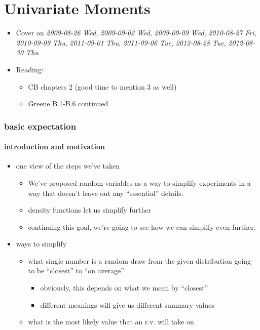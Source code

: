 
\part{Univariate Moments}

\begin{itemize}
\item Cover on \textit{2009-08-26 Wed}, \textit{2009-09-02 Wed}, \textit{2009-09-09 Wed},
     \textit{2010-08-27 Fri}, \textit{2010-09-09 Thu}, \textit{2011-09-01 Thu}, 
     \textit{2011-09-06 Tue}, \textit{2012-08-28 Tue}, \textit{2012-08-30 Thu}
\item Reading:
\begin{itemize}
\item CB chapters 2 (good time to mention 3 as well)
\item Greene B.1-B.6 continued
\end{itemize}
\end{itemize}
\section{basic expectation}
\label{sec-1}
\subsection{introduction and motivation}
\label{sec-1-1}

\begin{itemize}
\item one view of the steps we've taken
\begin{itemize}
\item We've proposed random variables as a way to simplify experiments
         in a way that doesn't leave out any ``essential'' details.
\item density functions let us simplify further
\item continuing this goal, we're going to see how we can simplify even further.
\end{itemize}
\item ways to simplify
\begin{itemize}
\item what single number is a random draw from the given distribution
         going to be ``closest'' to ``on average''
\begin{itemize}
\item obviously, this depends on what we mean by ``closest''
\item different meanings will give us different summary values
\end{itemize}
\item what is the most likely value that an r.v. will take on
\end{itemize}
\end{itemize}
